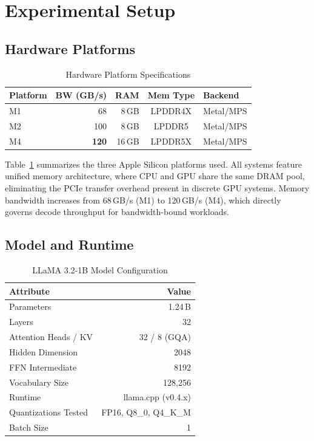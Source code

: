 \documentclass[conference]{IEEEtran}
\begin{document}
\section{Experimental Setup}

\subsection{Hardware Platforms}

\begin{table}[t]
\caption{Hardware Platform Specifications}
\label{tab:platforms}
\centering
\small
\begin{tabular}{lrrcl}
\toprule
\textbf{Platform} & \textbf{BW (GB/s)} & \textbf{RAM} & \textbf{Mem Type} & \textbf{Backend} \\
\midrule
M1 & 68  & 8\,GB  & LPDDR4X & Metal/MPS \\
M2 & 100 & 8\,GB  & LPDDR5  & Metal/MPS \\
M4 & \textbf{120} & 16\,GB & LPDDR5X & Metal/MPS \\
\bottomrule
\end{tabular}
\end{table}

Table~\ref{tab:platforms} summarizes the three Apple Silicon platforms used. All systems feature unified memory architecture, where CPU and GPU share the same DRAM pool, eliminating the PCIe transfer overhead present in discrete GPU systems. Memory bandwidth increases from 68\,GB/s (M1) to 120\,GB/s (M4), which directly governs decode throughput for bandwidth-bound workloads.

\subsection{Model and Runtime}

\begin{table}[t]
\caption{LLaMA 3.2-1B Model Configuration}
\label{tab:model}
\centering
\small
\begin{tabular}{lr}
\toprule
\textbf{Attribute} & \textbf{Value} \\
\midrule
Parameters             & 1.24\,B \\
Layers                 & 32 \\
Attention Heads / KV   & 32 / 8 (GQA) \\
Hidden Dimension       & 2048 \\
FFN Intermediate       & 8192 \\
Vocabulary Size        & 128,256 \\
Runtime                & llama.cpp (v0.4.x) \\
Quantizations Tested   & FP16, Q8\_0, Q4\_K\_M \\
Batch Size             & 1 \\
\bottomrule
\end{tabular}
\end{table}
\end{document}
